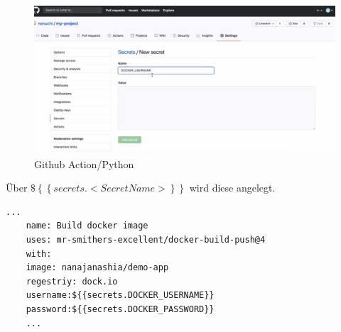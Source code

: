 \begin{figure}[H]
	\centering
	\includegraphics[scale = 0.2]{attachment/chapter_2/Scc106}
	\caption{Github Action/Python}
\end{figure}

Über $\$ \left\lbrace \left\lbrace secrets.<Secret Name> \right\rbrace\right\rbrace$ wird diese angelegt.

\begin{lstlisting}[style=Config, caption={Example Secrets}, captionpos=b]
	...
	name: Build docker image
	uses: mr-smithers-excellent/docker-build-push@4
	with:
	image: nanajanashia/demo-app
	regestriy: dock.io
	username:${{secrets.DOCKER_USERNAME}}
	password:${{secrets.DOCKER_PASSWORD}} 
	...
\end{lstlisting}
